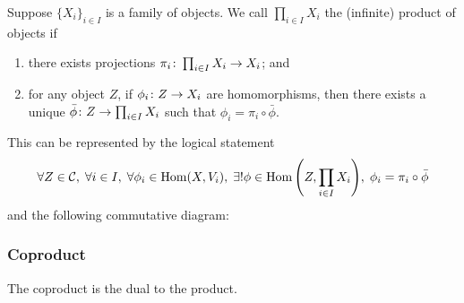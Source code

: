 \begin{definition}
    Suppose \({\{X_i\}}_{i \in I}\) is a family of objects.
    We call \(\prod_{i \in I} X_i\) the (infinite) product of objects if
    \begin{enumerate}[label={(\roman*)}, itemsep=0mm]
        \item there exists projections \(\pi_i\colon\prod_{i \in I} X_i\to X_i\); and
        \item for any object \(Z\),
            if \(\phi_i\colon Z\to X_i\) are homomorphisms,
            then there exists a unique \(\bar{\phi}\colon Z\to\prod_{i \in I} X_i\)
            such that \(\phi_i = \pi_i\circ\bar{\phi}\).
    \end{enumerate}

    This can be represented by the logical statement
    \begin{equation*}
        \forall Z \in \mca{C},\;
        \forall i \in I,\;
        \forall \phi_i \in \Hom(X,V_i),\;
        \exists! \phi \in \Hom\pqty{Z,\prod_{i \in I} X_i},\;
        \phi_i = \pi_i\circ\bar{\phi}
    \end{equation*}
    and the following commutative diagram:
    \begin{center}
    \end{center}
\end{definition}

\subsubsection*{Coproduct}

\begin{remark}
    The coproduct is the dual to the product.
\end{remark}

